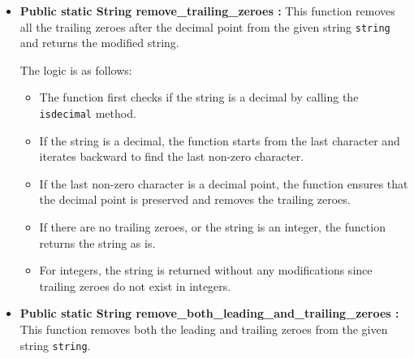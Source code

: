 \documentclass{article}
\begin{document}
\begin{itemize}
The logic is as follows:
\begin{itemize}
    \item The function first checks if the input string is a decimal by calling the \texttt{isdecimal} method.
    \item If the string is not a decimal (i.e., an integer), it delegates the removal of leading zeroes to the \texttt{AInteger.remove\_leading\_zeroes} method.
    \item For decimal strings, the function iterates through the characters of the string to find the first non-zero character or the decimal point.
    \item If the string contains a decimal point and all characters before it are zeroes, it removes these zeroes and ensures the sign of the string is preserved.
    \item The function returns the string with leading zeroes removed, and the sign preserved (if present).\\
\end{itemize}

\item \textbf{Public static String remove\_trailing\_zeroes :} 
This function removes all the trailing zeroes after the decimal point from the given string \texttt{string} and returns the modified string.

The logic is as follows:
\begin{itemize}
    \item The function first checks if the string is a decimal by calling the \texttt{isdecimal} method.
    \item If the string is a decimal, the function starts from the last character and iterates backward to find the last non-zero character.
    \item If the last non-zero character is a decimal point, the function ensures that the decimal point is preserved and removes the trailing zeroes.
    \item If there are no trailing zeroes, or the string is an integer, the function returns the string as is.
    \item For integers, the string is returned without any modifications since trailing zeroes do not exist in integers.\\
\end{itemize}

\item \textbf{Public static String remove\_both\_leading\_and\_trailing\_zeroes :} 
This function removes both the leading and trailing zeroes from the given string \texttt{string}.


\end{itemize}
\end{document}
